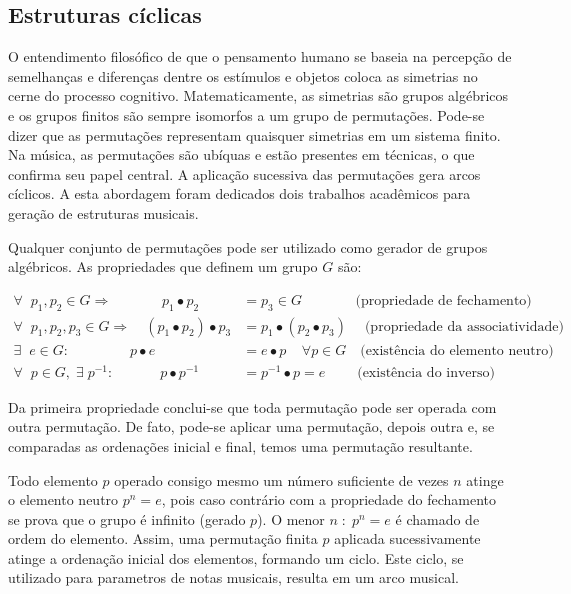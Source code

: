 \subsection{Estruturas cíclicas}\label{estCic}

O entendimento filosófico de que o pensamento humano se baseia
na percepção de semelhanças e diferenças dentre os estímulos
e objetos coloca
as simetrias no cerne do processo cognitivo.\cite{Deleuze}
Matematicamente,
as simetrias são grupos algébricos e os grupos finitos
são sempre isomorfos a um grupo de permutações. 
Pode-se dizer que
as permutações representam quaisquer simetrias em um sistema finito.
Na música, as permutações são ubíquas
e estão presentes em técnicas, o que confirma seu papel central.
A aplicação sucessiva das permutações gera arcos cíclicos.\cite{change,Zamacois,permMusic}
A esta abordagem foram dedicados dois trabalhos acadêmicos para geração de estruturas musicais.\cite{figgusOriginal, figgusEspacializacao}

Qualquer conjunto de permutações pode ser utilizado como gerador de grupos algébricos.\cite{groups} As propriedades que definem um grupo $G$ são:

\begin{equation}\label{eq:groups}
\begin{split}
\forall \;\; p_1,p_2 \in G \Rightarrow\quad\quad\quad\;\; p_1 \bullet p_2 & = p_3 \in G  \quad\quad\quad\;\;\;\text{(propriedade de fechamento)} \\
\forall \;\; p_1,p_2,p_3 \in G \Rightarrow\quad (p_1\bullet p_2)\bullet p_3 & = p_1\bullet (p_2\bullet p_3)\quad\;  \text{(propriedade da associatividade)} \\
\exists \;\; e \in G :\quad\quad\quad\quad\; p \bullet e & = e \bullet p \;\;\;\; \forall p \in G  \quad \text{(existência do elemento neutro)} \\
\forall \;\; p \in G, \;\exists\; p^{-1} :\quad\quad\quad\;  p\bullet p^{-1} & =p^{-1}\bullet p = e  \quad\quad\;\text{(existência do inverso)}
\end{split}
\end{equation}


Da primeira propriedade conclui-se que toda permutação pode ser operada com outra permutação. De fato, pode-se aplicar uma permutação, depois outra e, se comparadas as ordenações inicial e final, temos uma permutação resultante.

Todo elemento $p$ operado consigo mesmo um número suficiente de vezes $n$ atinge o elemento neutro $p^n=e$, pois caso contrário com a propriedade do fechamento se prova que o grupo é infinito (gerado $p$). O menor $n\;:\;p^n=e$ é chamado de ordem do elemento. Assim, uma permutação finita $p$ aplicada sucessivamente atinge a ordenação inicial dos elementos, formando um ciclo. Este ciclo, se utilizado para parametros de notas musicais, resulta em um arco musical.

